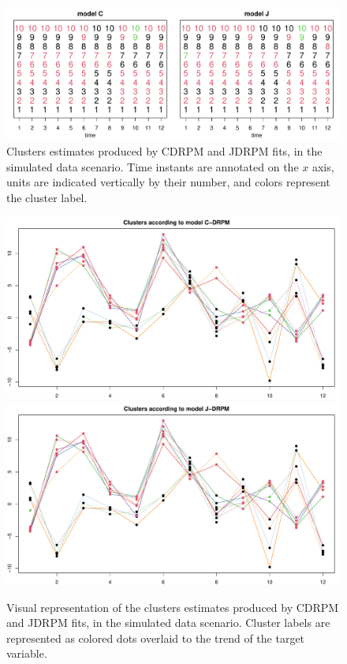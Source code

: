 \documentclass[12pt,	%
	a4paper,		%
	twoside,		%
	openright,		%
	titlepage,%
	]{book}
\theoremstyle{definition}
\begin{document}
\begin{figure}[!htb]
    \centering
    \includegraphics[width=1\linewidth]{Testing/Assessing correctness/no space/partizioni_nums.pdf}
    \caption[Clusters estimates of CDRPM and JDRPM, simulated data scenario]{Clusters estimates produced by CDRPM and JDRPM fits, in the simulated data scenario. Time instants are annotated on the $x$ axis, units are indicated vertically by their number, and colors represent the cluster label.}
    \label{fig:partizioni no space}
\end{figure}
\begin{figure}[!htb]
    \centering
    \includegraphics[width=1\linewidth]{Testing/Assessing correctness/no space/clusters_C.pdf}
    \includegraphics[width=1\linewidth]{Testing/Assessing correctness/no space/clusters_J.pdf}
    \caption[Visual representation of the clusters estimates of CDRPM and JDRPM, simulated data scenario]{Visual representation of the clusters estimates produced by CDRPM and JDRPM fits, in the simulated data scenario. Cluster labels are represented as colored dots overlaid to the trend of the target variable.}
    \label{fig:clusters no space}
\end{figure}
\end{document}
